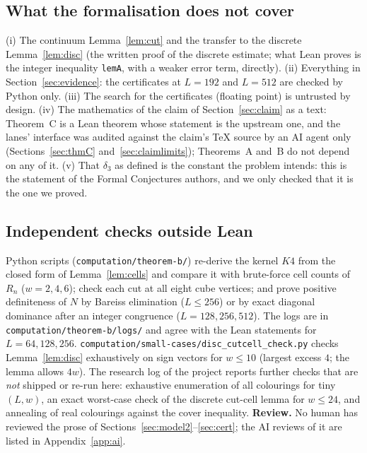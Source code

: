 \documentclass[11pt]{amsart}
\theoremstyle{remark}
\newcommand{\lean}[1]{\texttt{#1}}
\begin{document}
\subsection{What the formalisation does not cover}
(i) The continuum Lemma~\ref{lem:cut} and the transfer to the discrete Lemma~\ref{lem:disc} (the written proof of the discrete estimate; what Lean proves is the integer inequality \lean{lemA}, with a weaker error term, directly). (ii) Everything in Section~\ref{sec:evidence}: the certificates at $L=192$ and $L=512$ are checked by Python only. (iii) The search for the certificates (floating point) is untrusted by design.
(iv) The mathematics of the claim of Section~\ref{sec:claim} as a text: Theorem~C is a Lean theorem whose statement is the upstream one, and the lanes' interface was audited against the claim's TeX source by an AI agent only (Sections~\ref{sec:thmC} and~\ref{sec:claimlimits}); Theorems~A and~B do not depend on any of it. (v) That $\delta_3$ as defined is the constant the problem intends: this is the statement of the Formal Conjectures authors, and we only checked that it is the one we proved.

\subsection{Independent checks outside Lean}
Python scripts (\texttt{computation/theorem-b/}) re-derive the kernel $K4$ from the closed form of Lemma~\ref{lem:cells} and compare it with brute-force cell counts of $R_n$ ($w=2,4,6$); check each cut at all eight cube vertices; and prove positive definiteness of $N$ by Bareiss elimination ($L\le256$) or by exact diagonal dominance after an integer congruence ($L=128,256,512$).
The logs are in \texttt{computation/theorem-b/logs/} and agree with the Lean statements for $L=64,128,256$. \texttt{computation/small-cases/disc\_cutcell\_check.py} checks Lemma~\ref{lem:disc} exhaustively on sign vectors for $w\le10$ (largest excess $4$; the lemma allows $4w$).
The research log of the project reports further checks that are \emph{not} shipped or re-run here: exhaustive enumeration of all colourings for tiny $(L,w)$, an exact worst-case check of the discrete cut-cell lemma for $w\le24$, and annealing of real colourings against the cover inequality.
\textbf{Review.} No human has reviewed the prose of Sections~\ref{sec:model2}--\ref{sec:cert}; the AI reviews of it are listed in Appendix~\ref{app:ai}.
\end{document}
